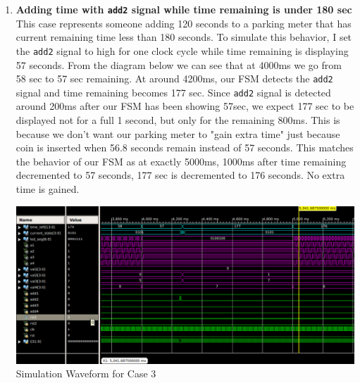\documentclass{article}
\begin{document}
\begin{enumerate}
    \item \textbf{Adding time with \texttt{add2} signal while time remaining is under 180 sec}\\
   This case represents someone adding 120 seconds to a parking meter that has current remaining time less than 180 seconds. To simulate this behavior, I set the \texttt{add2} signal to high for one clock cycle while time remaining is displaying 57 seconds. From the diagram below we can see that at 4000ms we go from 58 sec to 57 sec remaining. At around 4200ms, our FSM detects the \texttt{add2} signal and time remaining becomes 177 sec. Since \texttt{add2} signal is detected around 200ms after our FSM has been showing 57sec, we expect 177 sec to be displayed not for a full 1 second, but only for the remaining 800ms. This is because we don't want our parking meter to "gain extra time" just because coin is inserted when 56.8 seconds remain instead of 57 seconds. This matches the behavior of our FSM as at exactly 5000ms, 1000ms after time remaining decremented to 57 seconds, 177 sec is decremented to 176 seconds. No extra time is gained. 
    \begin{center}
        \includegraphics[scale=0.37]{waveform-3.png} \\
        \caption{Simulation Waveform for Case 3}
    \end{center}
    \par
    

\end{enumerate}
\end{document}
